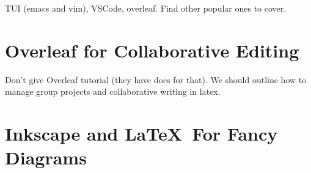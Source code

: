 \documentclass[12pt]{article}
\begin{document}
TUI (emacs and vim), VSCode, overleaf. Find other popular ones to cover.

\section{Overleaf for Collaborative Editing}%
\label{overleaf}

Don't give Overleaf tutorial (they have docs for that). We should outline how to manage group projects and collaborative writing in latex.

\section{Inkscape and \LaTeX\ For Fancy Diagrams}%
\label{inkscape-latex}
\end{document}
